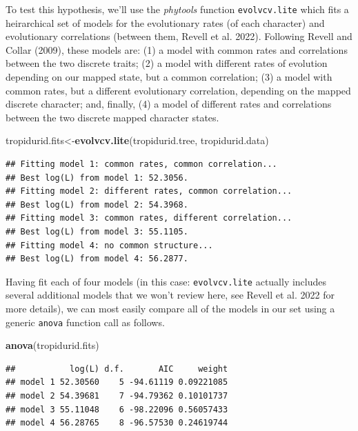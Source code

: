 \documentclass[fleqn,10pt,lineno]{wlpeerj} %
\newenvironment{Shaded}{\begin{snugshade}}{\end{snugshade}}
\newcommand{\FunctionTok}[1]{\textcolor[rgb]{0.13,0.29,0.53}{\textbf{#1}}}
\newcommand{\NormalTok}[1]{#1}
\newcommand{\OtherTok}[1]{\textcolor[rgb]{0.56,0.35,0.01}{#1}}
\begin{document}
To test this hypothesis, we'll use the \emph{phytools} function \texttt{evolvcv.lite} which fits a heirarchical set of models for the evolutionary rates (of each character) and evolutionary correlations (between them, Revell et al. 2022). Following Revell and Collar (2009), these models are: (1) a model with common rates and correlations between the two discrete traits; (2) a model with different rates of evolution depending on our mapped state, but a common correlation; (3) a model with common rates, but a different evolutionary correlation, depending on the mapped discrete character; and, finally, (4) a model of different rates and correlations between the two discrete mapped character states.

\begin{Shaded}
\begin{Highlighting}[]
\NormalTok{tropidurid.fits}\OtherTok{\textless{}{-}}\FunctionTok{evolvcv.lite}\NormalTok{(tropidurid.tree,}
\NormalTok{  tropidurid.data)}
\end{Highlighting}
\end{Shaded}

\begin{verbatim}
## Fitting model 1: common rates, common correlation...
## Best log(L) from model 1: 52.3056.
## Fitting model 2: different rates, common correlation...
## Best log(L) from model 2: 54.3968.
## Fitting model 3: common rates, different correlation...
## Best log(L) from model 3: 55.1105.
## Fitting model 4: no common structure...
## Best log(L) from model 4: 56.2877.
\end{verbatim}

Having fit each of four models (in this case: \texttt{evolvcv.lite} actually includes several additional models that we won't review here, see Revell et al. 2022 for more details), we can most easily compare all of the models in our set using a generic \texttt{anova} function call as follows.

\begin{Shaded}
\begin{Highlighting}[]
\FunctionTok{anova}\NormalTok{(tropidurid.fits)}
\end{Highlighting}
\end{Shaded}

\begin{verbatim}
##           log(L) d.f.       AIC     weight
## model 1 52.30560    5 -94.61119 0.09221085
## model 2 54.39681    7 -94.79362 0.10101737
## model 3 55.11048    6 -98.22096 0.56057433
## model 4 56.28765    8 -96.57530 0.24619744
\end{verbatim}
\end{document}
